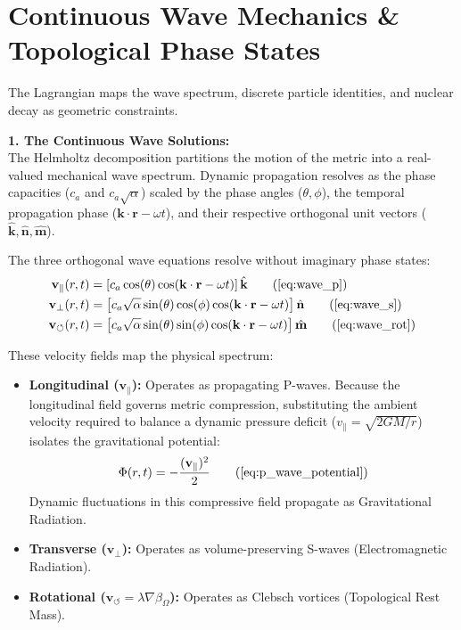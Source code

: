 \section{Continuous Wave Mechanics \& Topological Phase States}
\label{sec:deriv_wave_mechanics}

The Lagrangian maps the wave spectrum, discrete particle identities, and nuclear decay as geometric constraints.

\textbf{1. The Continuous Wave Solutions:} \\
The Helmholtz decomposition partitions the motion of the metric into a real-valued mechanical wave spectrum. Dynamic propagation resolves as the phase capacities ($c_a$ and $c_a\sqrt{\alpha}$) scaled by the phase angles ($\theta, \phi$), the temporal propagation phase ($\mathbf{k} \cdot \mathbf{r} - \omega t$), and their respective orthogonal unit vectors ($\hat{\mathbf{k}}, \hat{\mathbf{n}}, \hat{\mathbf{m}}$). 

The three orthogonal wave equations resolve without imaginary phase states: 
\begin{align}
    \mathbf{v}_{\parallel}(r,t) &= \left[ c_a \cos(\theta) \cos(\mathbf{k} \cdot \mathbf{r} - \omega t) \right] \hat{\mathbf{k}} \tag{\ref{eq:wave_p}} 
    \\
    \mathbf{v}_{\perp}(r,t) &= \left[ c_a \sqrt{\alpha} \sin(\theta)\cos(\phi) \cos(\mathbf{k} \cdot \mathbf{r} - \omega t) \right] \hat{\mathbf{n}} \tag{\ref{eq:wave_s}} 
    \\
    \mathbf{v}_{\circlearrowleft}(r,t) &= \left[ c_a \sqrt{\alpha} \sin(\theta)\sin(\phi) \cos(\mathbf{k} \cdot \mathbf{r} - \omega t) \right] \hat{\mathbf{m}} \tag{\ref{eq:wave_rot}} 
\end{align}

These velocity fields map the physical spectrum: 
\begin{itemize}
    \item \textbf{Longitudinal ($\mathbf{v}_{\parallel}$):} Operates as propagating P-waves. Because the longitudinal field governs metric compression, substituting the ambient velocity required to balance a dynamic pressure deficit ($v_{\parallel} = \sqrt{2GM/r}$) isolates the gravitational potential: 
    \begin{equation}
        \Phi(r,t) = - \frac{(\mathbf{v}_{\parallel})^2}{2} \tag{\ref{eq:p_wave_potential}} 
    \end{equation}
    Dynamic fluctuations in this compressive field propagate as Gravitational Radiation.
    \item \textbf{Transverse ($\mathbf{v}_{\perp}$):} Operates as volume-preserving S-waves (Electromagnetic Radiation). 
    \item \textbf{Rotational ($\mathbf{v}_{\circlearrowleft} = \lambda \nabla \beta_\Omega$):} Operates as Clebsch vortices (Topological Rest Mass). 
\end{itemize}

